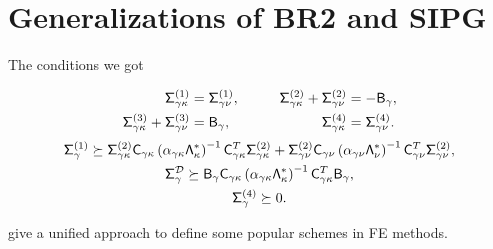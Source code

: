 \documentclass{beamer}
\begin{document}
\section{Generalizations of BR2 and SIPG}
\begin{frame}
    The conditions we got
    \begin{block}{}
        \begin{equation*}
        \begin{aligned}
        \Siggk{1} &= \Siggn{1}, &\qquad  
        \Siggk{2} + \Siggn{2} &= -\B_{\gamma}, \\
        \Siggk{3} + \Siggn{3} &= \B_{\gamma}, &\qquad
        \Siggk{4} &= \Siggn{4}.
        \end{aligned}
        \end{equation*}
        \begin{gather*}
        \Siggam{1} \succeq \Siggk{2} \Cgk
        \left(\alpha_{\gamma\kappa}\Lam_{\kappa}^{*}\right)^{-1}\Cgk^T \Siggk{2}
        + \Siggn{2} \Cgn \left(\alpha_{\gamma\nu} \Lam_{\nu}^{*}\right)^{-1}\Cgn^T \Siggn{2}, \\
        \Sig_{\gamma}^{\fnc{D}} \succeq \Bg \Cgk
        \left(\alpha_{\gamma\kappa}\Lam_{\kappa}^{*}\right)^{-1}\Cgk^T \Bg ,\\
        \Sig_{\gamma}^{(4)} \succeq 0.
        \end{gather*}
    \end{block}
    \vskip 3mm
    give a unified approach to define some popular schemes in FE methods. 
\end{frame}
\end{document}
